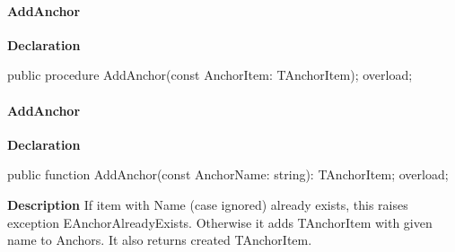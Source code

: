 \documentclass{report}
\newif\ifpdf
\begin{document}
\paragraph*{AddAnchor}\hspace*{\fill}

\label{PasDoc_Items.TExternalItem-AddAnchor}
\begin{list}{}{
\setlength{\itemindent}{0cm}
\setlength{\listparindent}{0cm}
\setlength{\leftmargin}{\evensidemargin}
\addtolength{\leftmargin}{\tmplength}
\settowidth{\labelsep}{X}
\addtolength{\leftmargin}{\labelsep}
\setlength{\labelwidth}{\tmplength}
}
\item[\textbf{Declaration}\hfill]
\ifpdf
\begin{flushleft}
\fi
\begin{ttfamily}
public procedure AddAnchor(const AnchorItem: TAnchorItem); overload;\end{ttfamily}

\ifpdf
\end{flushleft}
\fi

\end{list}
\paragraph*{AddAnchor}\hspace*{\fill}

\label{PasDoc_Items.TExternalItem-AddAnchor}
\begin{list}{}{
\setlength{\itemindent}{0cm}
\setlength{\listparindent}{0cm}
\setlength{\leftmargin}{\evensidemargin}
\addtolength{\leftmargin}{\tmplength}
\settowidth{\labelsep}{X}
\addtolength{\leftmargin}{\labelsep}
\setlength{\labelwidth}{\tmplength}
}
\item[\textbf{Declaration}\hfill]
\ifpdf
\begin{flushleft}
\fi
\begin{ttfamily}
public function AddAnchor(const AnchorName: string): TAnchorItem; overload;\end{ttfamily}

\ifpdf
\end{flushleft}
\fi

\par
\item[\textbf{Description}]
If item with Name (case ignored) already exists, this raises exception EAnchorAlreadyExists. Otherwise it adds TAnchorItem with given name to Anchors. It also returns created TAnchorItem.

\end{list}
\end{document}
